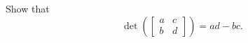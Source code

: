 \begin{exercise}
  \label{ex:hw05:two-by-two-determinant}
  Show that
  \[
    \det\left(\begin{bmatrix}a&c\\b&d\end{bmatrix}\right)=ad-bc.
  \]
\end{exercise}

